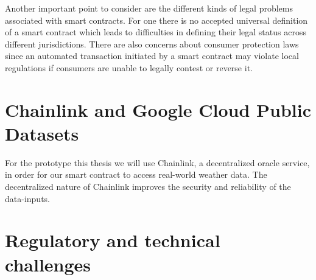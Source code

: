 Another important point to consider are the different kinds of legal problems associated with smart contracts. For one there is no accepted universal definition of a smart contract which leads to difficulties in defining their legal status across different jurisdictions. There are also concerns about consumer protection laws since an automated transaction initiated by a smart contract may violate local regulations if consumers are unable to legally contest or reverse it. \autocite{ferreira2021regulating}

\section{Chainlink and Google Cloud Public Datasets}\label{section:chainlink_google_cloud_datasets}

For the prototype this thesis we will use Chainlink, a decentralized oracle service, in order for our smart contract to access real-world weather data. The decentralized nature of Chainlink improves the security and reliability of the data-inputs. \autocite{beniiche2020study}

\section{Regulatory and technical challenges}\label{section:regulatory_technical_challenges}

